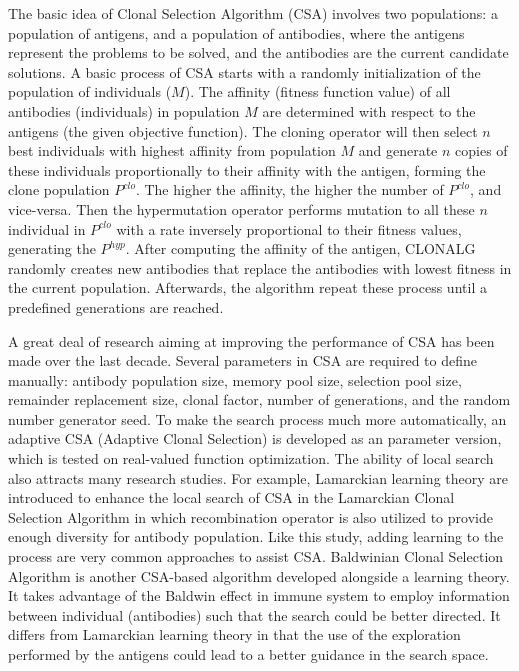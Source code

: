 \documentclass[12pt]{article}
\begin{document}
The basic idea of Clonal Selection Algorithm (CSA) involves two populations: a population of antigens, and a population of antibodies, where the antigens represent the problems to be solved, and the antibodies are the current candidate solutions. A basic process of CSA starts with a randomly initialization of the population of individuals ($M$). The affinity (fitness function value) of all antibodies (individuals) in population $M$ are determined with respect to the antigens (the given objective function). The cloning operator will then select $n$ best individuals with highest affinity from population $M$ and generate $n$ copies of these individuals proportionally to their affinity with the antigen, forming the clone population $P^{clo}$. The higher the affinity, the higher the number of $P^{clo}$, and vice-versa. Then the hypermutation operator performs mutation to all these $n$ individual in $P^{clo}$ with a rate inversely proportional to their fitness values, generating the $P^{hyp}$. After computing the affinity of the antigen, CLONALG randomly creates new antibodies that replace the antibodies with lowest fitness in the current population. Afterwards, the algorithm repeat these process until a predefined generations are reached.

A great deal of research aiming at improving the performance of CSA has been made over the last decade. Several parameters in CSA are required to define manually: antibody population size, memory pool size, selection pool size, remainder replacement size, clonal factor, number of generations, and the random number generator seed. To make the search process much more automatically, an adaptive CSA (Adaptive Clonal Selection) is developed as an parameter version, which is tested on real-valued function optimization. \cite{Garrett04Parameter-free} The ability of local search also attracts many research studies. For example, Lamarckian learning theory are introduced to enhance the local search of CSA in the Lamarckian Clonal Selection Algorithm in which recombination operator is also utilized to provide enough diversity for antibody population. \cite{Yang08ImprovedClonal, Gong10LamarckianLearning} Like this study, adding learning to the process are very common approaches to assist CSA. Baldwinian Clonal Selection Algorithm is another CSA-based algorithm developed alongside a learning theory. It takes advantage of the Baldwin effect in immune system to employ information between individual (antibodies) such that the search could be better directed. It differs from Lamarckian learning theory in that the use of the exploration performed by the antigens could lead to a better guidance in the search space. \cite{Gong10Baldwinianlearning}
\end{document}

